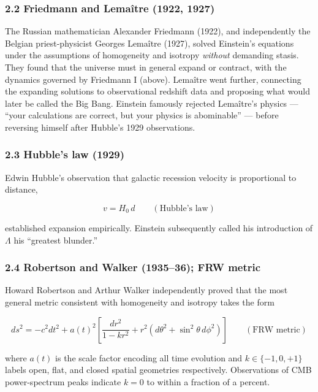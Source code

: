 \documentclass[
]{article}
\begin{document}
\subsubsection{2.2 Friedmann and Lemaître (1922,
1927)}\label{friedmann-and-lemauxeetre-1922-1927}

The Russian mathematician Alexander Friedmann (1922), and independently
the Belgian priest-physicist Georges Lemaître (1927), solved Einstein's
equations under the assumptions of homogeneity and isotropy
\emph{without} demanding stasis. They found that the universe must in
general expand or contract, with the dynamics governed by Friedmann I
(above). Lemaître went further, connecting the expanding solutions to
observational redshift data and proposing what would later be called the
Big Bang. Einstein famously rejected Lemaître's physics --- ``your
calculations are correct, but your physics is abominable'' --- before
reversing himself after Hubble's 1929 observations.

\subsubsection{2.3 Hubble's law (1929)}\label{hubbles-law-1929}

Edwin Hubble's observation that galactic recession velocity is
proportional to distance,

\[v = H_0 \, d \qquad (\text{Hubble's law})\]

established expansion empirically. Einstein subsequently called his
introduction of \(\Lambda\) his ``greatest blunder.''

\subsubsection{2.4 Robertson and Walker (1935--36); FRW
metric}\label{robertson-and-walker-193536-frw-metric}

Howard Robertson and Arthur Walker independently proved that the most
general metric consistent with homogeneity and isotropy takes the form

\[ds^2 = -c^2 dt^2 + a(t)^2 \left[ \frac{dr^2}{1 - k r^2} + r^2 \left(d\theta^2 + \sin^2\theta\, d\phi^2 \right) \right] \qquad (\text{FRW metric})\]

where \(a(t)\) is the scale factor encoding all time evolution and
\(k \in \{-1, 0, +1\}\) labels open, flat, and closed spatial geometries
respectively. Observations of CMB power-spectrum peaks indicate
\(k = 0\) to within a fraction of a percent.
\end{document}
